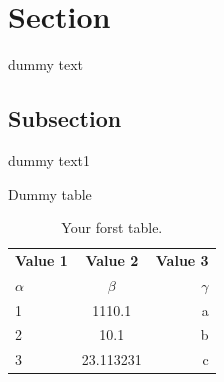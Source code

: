 \documentclass{article}
\begin{document}
    \tableofcontents
    \newpage
    \section{Section}
    dummy text
    \subsection{Subsection}
    dummy text1
    \begin{table}
        \caption{Dummy table}
    \end{table}
    \begin{appendix}
        \listoffigures
        \listoftables
    \end{appendix}
    \newpage
    
    
    \begin{table}[h!]
        \begin{center}
            \caption{Your forst table.}
            \label{tab:table1}
            \begin{tabular}{|l|c|r|}
                \textbf{Value 1} & \textbf{Value 2} & \textbf{Value 3}\\
                $\alpha$ & $\beta$ & $\gamma$\\
                \hline
                1 & 1110.1 & a\\
                2 & 10.1 & b\\
                3 & 23.113231 & c\\
            \end{tabular}
        \end{center}
    \end{table}
\end{document}
